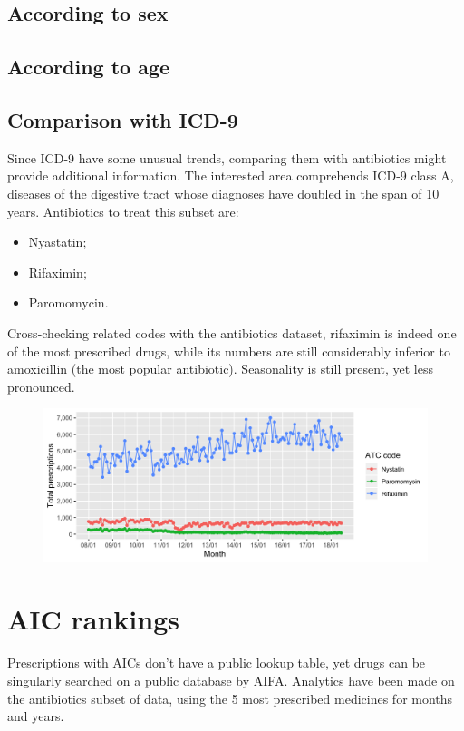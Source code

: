 \subsection{According to sex} %

\subsection{According to age}

\subsection{Comparison with ICD-9}
Since ICD-9 have some unusual trends, comparing them with antibiotics might provide additional information. The interested area comprehends ICD-9 class A, diseases of the digestive tract whose diagnoses have doubled in the span of 10 years. Antibiotics to treat this subset are:
\begin{itemize}
	\item Nyastatin;
	\item Rifaximin;
	\item Paromomycin.
\end{itemize}

Cross-checking related codes with the antibiotics dataset, rifaximin is indeed one of the most prescribed drugs, while its numbers are still considerably inferior to amoxicillin (the most popular antibiotic). Seasonality is still present, yet less pronounced. 

\begin{figure}[h]
	\centering
	\includegraphics[scale=0.3]{../plots/top_atc_a-month.png}
\end{figure}

\section{AIC rankings}
Prescriptions with AICs don't have a public lookup table, yet drugs can be singularly searched on a public database by AIFA. Analytics have been made on the antibiotics subset of data, using the 5 most prescribed medicines for months and years.


